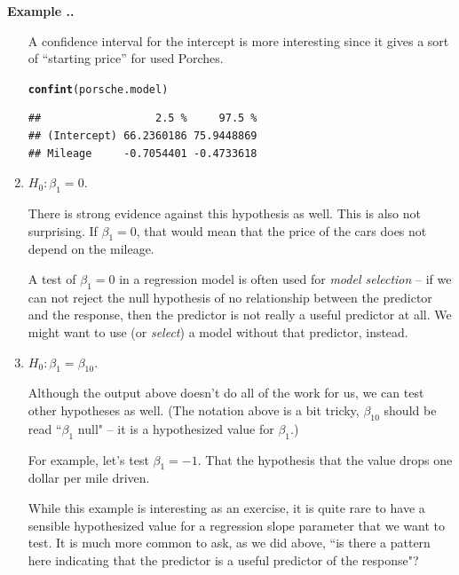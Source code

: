 \documentclass[twoside]{book}\usepackage[]{graphicx}\usepackage[]{xcolor}
\makeatletter
\newcommand{\hlstd}[1]{\textcolor[rgb]{0.345,0.345,0.345}{#1}}%
\newcommand{\hlkwd}[1]{\textcolor[rgb]{0.737,0.353,0.396}{\textbf{#1}}}%
\newenvironment{kframe}{%
 \def\at@end@of@kframe{}%
 \ifinner\ifhmode%
  \def\at@end@of@kframe{\end{minipage}}%
  \begin{minipage}{\columnwidth}%
 \fi\fi%
 \def\FrameCommand##1{\hskip\@totalleftmargin \hskip-\fboxsep
 \colorbox{shadecolor}{##1}\hskip-\fboxsep
     \hskip-\linewidth \hskip-\@totalleftmargin \hskip\columnwidth}%
 \MakeFramed {\advance\hsize-\width
   \@totalleftmargin\z@ \linewidth\hsize
   \@setminipage}}%
 {\par\unskip\endMakeFramed%
 \at@end@of@kframe}
\newenvironment{knitrout}{}{} %
\newcounter{example}[section]
\newenvironment{example}%
{\refstepcounter{example}%
\textbf{Example \thesection.\arabic{example}. }}%
{}
\makeatother
\begin{document}
\begin{example}
\begin{enumerate}
		A confidence interval for the intercept is more interesting since it gives a sort 
		of ``starting price'' for used Porches.
\begin{knitrout}
\color{fgcolor}\begin{kframe}
\begin{alltt}
\hlkwd{confint}\hlstd{(porsche.model)}
\end{alltt}
\begin{verbatim}
##                  2.5 %     97.5 %
## (Intercept) 66.2360186 75.9448869
## Mileage     -0.7054401 -0.4733618
\end{verbatim}
\end{kframe}
\end{knitrout}


	\item
		$H_0: \beta_1 = 0$.

		There is strong evidence against this hypothesis as well.  This is also not surprising.
		If $\beta_1 = 0$, that would mean that the price of the cars does not depend on the mileage.

		A test of $\beta_1=0$ in a regression model is often used for \emph{model selection} -- if we can not reject the null hypothesis of no relationship between the predictor and the response, then the predictor is not really a useful predictor at all. We might want to use (or \emph{select}) a model without that predictor, instead.

	\item
		$H_0: \beta_1 = \beta_{10}$.

		Although the output above doesn't do all of the work for us, we can test other
		hypotheses as well.  (The notation above is a bit tricky, $\beta_{10}$ should be read
		``$\beta_1$ null" -- it is a hypothesized value for $\beta_1$.)
		
		For example, let's test $\beta_1 = -1$.  That the hypothesis that the value 
		drops one dollar per mile driven.
    
    While this example is interesting as an exercise, it is quite rare to have a sensible hypothesized value for a regression slope parameter that we want to test.  It is much more common to ask, as we did above, ``is there a pattern here indicating that the predictor is a useful predictor of the response"?


\end{enumerate}
\end{example}
\end{document}

